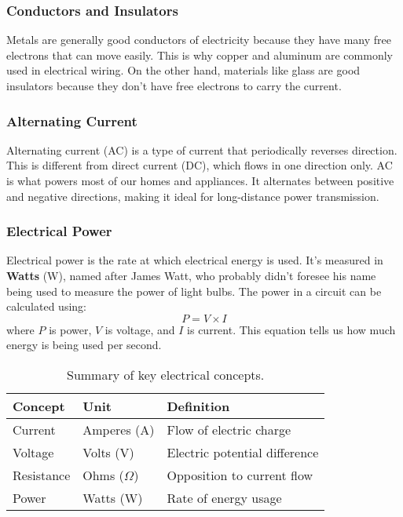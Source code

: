 \subsubsection*{Conductors and Insulators}
Metals are generally good conductors of electricity because they have many free electrons that can move easily. This is why copper and aluminum are commonly used in electrical wiring. On the other hand, materials like glass are good insulators because they don't have free electrons to carry the current. 

\subsubsection*{Alternating Current}
Alternating current (AC) is a type of current that periodically reverses direction. This is different from direct current (DC), which flows in one direction only. AC is what powers most of our homes and appliances. It alternates between positive and negative directions, making it ideal for long-distance power transmission.

\subsubsection*{Electrical Power}
Electrical power is the rate at which electrical energy is used. It's measured in \textbf{Watts} (W), named after James Watt, who probably didn't foresee his name being used to measure the power of light bulbs. The power in a circuit can be calculated using:
\begin{equation}
    P = V \times I
    \label{eq:power}
\end{equation}
where \( P \) is power, \( V \) is voltage, and \( I \) is current. This equation tells us how much energy is being used per second.

\begin{table}[h]
    \centering
    \caption{Summary of key electrical concepts.}
    \label{tab:electrical-concepts}
    \begin{tabular}{|l|l|l|}
        \hline
        \textbf{Concept} & \textbf{Unit} & \textbf{Definition} \\
        \hline
        Current & Amperes (A) & Flow of electric charge \\
        Voltage & Volts (V) & Electric potential difference \\
        Resistance & Ohms (\(\Omega\)) & Opposition to current flow \\
        Power & Watts (W) & Rate of energy usage \\
        \hline
    \end{tabular}
\end{table}

